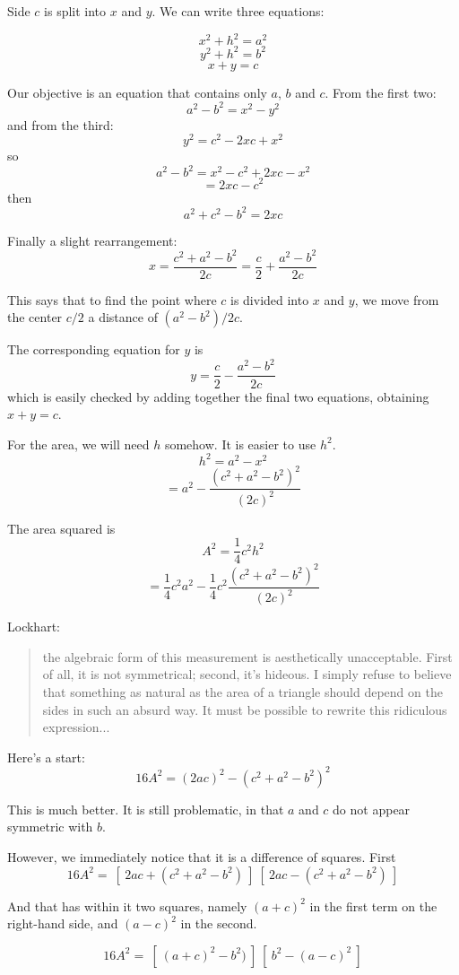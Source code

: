 \documentclass[11pt, oneside]{article}
\begin{document}
Side $c$ is split into $x$ and $y$.  We can write three equations:

\[ x^2 + h^2 = a^2 \]
\[ y^2 + h^2 = b^2 \]
\[ x + y = c \]

Our objective is an equation that contains only $a$, $b$ and $c$.  From the first two:
\[ a^2 - b^2 = x^2 - y^2 \]
and from the third:
\[ y^2 = c^2 - 2xc + x^2 \]
so
\[ a^2 - b^2 = x^2 - c^2 + 2xc - x^2 \]
\[ = 2xc - c^2 \]
then
\[ a^2 + c^2 - b^2 = 2xc \]

Finally a slight rearrangement:
\[ x = \frac{c^2 + a^2-b^2}{2c} = \frac{c}{2} + \frac{a^2-b^2}{2c}   \]

This says that to find the point where $c$ is divided into $x$ and $y$, we move from the center $c/2$ a distance of $(a^2 - b^2)/2c$.

The corresponding equation for $y$ is
\[ y = \frac{c}{2} - \frac{a^2-b^2}{2c} \]
which is easily checked by adding together the final two equations, obtaining $x + y = c$.

For the area, we will need $h$ somehow.  It is easier to use $h^2$.
\[ h^2 = a^2 - x^2 \]
\[ = a^2 - \frac{(c^2 + a^2-b^2)^2}{(2c)^2}  \]

The area squared is
\[ A^2 = \frac{1}{4}c^2 h^2 \]
\[ = \frac{1}{4} c^2 a^2 - \frac{1}{4} c^2 \frac{(c^2 + a^2-b^2)^2}{(2c)^2}  \]

Lockhart:

\begin{quote}
the algebraic form of this measurement is aesthetically unacceptable. First of all, it is not symmetrical; second, it's hideous. I simply refuse to believe that something as natural as the area of a triangle should depend on the sides in such an absurd way. It must be possible to rewrite this ridiculous expression...
\end{quote}

Here's a start:
\[ 16A^2 = (2ac)^2 - (c^2 + a^2-b^2)^2 \]

This is much better.  It is still problematic, in that $a$ and $c$ do not appear symmetric with $b$.

However, we immediately notice that it is a difference of squares.  First
\[ 16A^2 = \ [ \ 2ac + (c^2 + a^2-b^2) \ ] \ [ \ 2ac - (c^2 + a^2-b^2) \ ]  \]

And that has within it two squares, namely $(a + c)^2$ in the first term on the right-hand side, and $(a - c)^2$ in the second.

\[ 16A^2 = \ [ \ (a + c)^2 -b^2) \ ] \ [ \ b^2 - (a - c)^2 \ ]  \]
\end{document}
